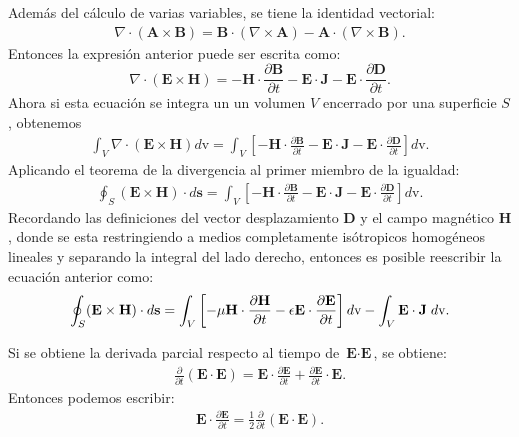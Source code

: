 \documentclass[11pt,fleqn]{book} %
\begin{document}
 Adem\'as del c\'alculo de varias variables, se tiene la identidad vectorial:
\begin{eqnarray*}
\nabla\cdot(\textbf{A}\times\textbf{B})=\textbf{B}\cdot(\nabla\times\textbf{A})-\textbf{A}\cdot(\nabla\times\textbf{B}).
\end{eqnarray*}
 Entonces la expresi\'on anterior puede ser escrita como:
\begin{equation}
\nabla\cdot(\textbf{E}\times\textbf{H})=-\textbf{H}\cdot\frac{\partial \textbf{B}}{\partial t}- \textbf{E}\cdot\textbf{J}-\textbf{E}\cdot\frac{\partial \textbf{D}}{\partial t}.  \label{Resta de Rot}
\end{equation}
Ahora si esta ecuaci\'on se integra un un volumen $V$ encerrado por una superficie $S$, obtenemos
\begin{eqnarray*}
\int_{V}\nabla\cdot(\textbf{E}\times\textbf{H})d\text{v}=\int_{V}\left[-\textbf{H}\cdot\frac{\partial \textbf{B}}{\partial t}- \textbf{E}\cdot\textbf{J}-\textbf{E}\cdot\frac{\partial \textbf{D}}{\partial t}\right]d\text{v}.
\end{eqnarray*}
Aplicando el teorema de la divergencia al primer miembro de la igualdad:
\begin{eqnarray*}
\oint_{S}(\textbf{E}\times\textbf{H})\cdot d\textbf{s}=\int_{V}\left[-\textbf{H}\cdot\frac{\partial \textbf{B}}{\partial t}- \textbf{E}\cdot\textbf{J}-\textbf{E}\cdot\frac{\partial \textbf{D}}{\partial t}\right]d\text{v}.
\end{eqnarray*}
Recordando las definiciones del vector desplazamiento $\textbf{D}$ y el campo magn\'etico $\textbf{H}$, donde se esta restringiendo a medios completamente is\'otropicos homog\'eneos lineales y separando la integral del lado derecho, entonces es posible reescribir la ecuaci\'on anterior como:
\begin{equation}
\oint_{S}(\textbf{E}\times\textbf{H})\cdot d\textbf{s}=\int_{V}\left[-\mu\textbf{H}\cdot\frac{\partial \textbf{H}}{\partial t}-\epsilon\textbf{E}\cdot\frac{\partial \textbf{E}}{\partial t}\right]d\text{v}-\int_{V} \textbf{E}\cdot\textbf{J} \hspace{1mm} d\text{v}.  \label{Integral resta}
\end{equation}

\begin{obs}

Si se obtiene la derivada parcial respecto al tiempo de $\textbf{E}\cdot\textbf{E}$, se obtiene:
\begin{eqnarray*}
\frac{\partial}{\partial t}\left(\textbf{E}\cdot\textbf{E}\right)=\textbf{E}\cdot\frac{\partial\textbf{E}}{\partial t}+\frac{\partial\textbf{E}}{\partial t} \cdot\textbf{E}.
\end{eqnarray*}
Entonces podemos escribir:
\begin{eqnarray*}
\textbf{E}\cdot\frac{\partial\textbf{E}}{\partial t}=\frac{1}{2}\frac{\partial}{\partial t}\left(\textbf{E}\cdot\textbf{E}\right).
\end{eqnarray*}
\end{obs}
\end{document}
